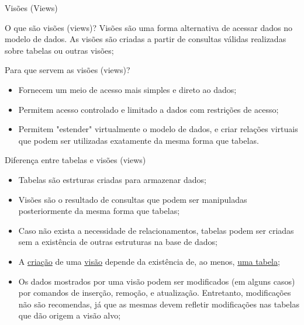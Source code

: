 \documentclass[xcolor=x11names,compress]{beamer}
\begin{document}
\begin{frame}{Visões (Views)}

\begin{alertblock}{O que são visões (views)?}
Visões são uma forma alternativa de acessar dados no modelo de dados. As visões são criadas a partir de consultas válidas realizadas sobre tabelas ou outras visões;
\end{alertblock}

\pause 

\begin{alertblock}{Para que servem as visões (views)?}

\begin{itemize}
\itemsep 3mm
\item Fornecem um meio de acesso mais simples e direto ao dados;

\item Permitem acesso controlado e limitado a dados com restrições de acesso;

\item Permitem "estender" virtualmente o modelo de dados, e criar relações virtuais que podem ser utilizadas exatamente da mesma forma que tabelas.

\end{itemize}

\end{alertblock} 

\end{frame}

\begin{frame}[allowframebreaks]{Diferença entre tabelas e visões (views)}

\begin{itemize}
\itemsep 5mm

\item Tabelas são estrturas criadas para armazenar dados;

\item Visões são o resultado de consultas que podem ser manipuladas posteriormente da mesma forma que tabelas;

\item Caso não exista a necessidade de relacionamentos, tabelas podem ser criadas sem a existência de outras estruturas na base de dados;

\item A \underline{criação} de uma \underline{visão} depende da existência de, ao menos, \underline{uma tabela};

\item Os dados mostrados por uma visão podem ser modificados (em alguns casos) por comandos de inserção, remoção, e atualização. Entretanto, modificações não são recomendas, já que as mesmas devem refletir modificações nas tabelas que dão origem a  visão alvo;
\end{itemize}

\end{frame}
\end{document}
